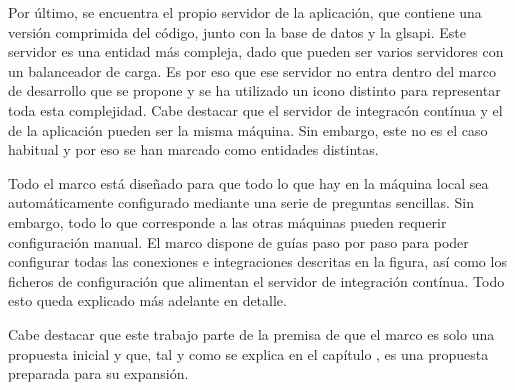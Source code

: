 Por último, se encuentra el propio servidor de la aplicación, que contiene una versión comprimida del código, junto con la base de datos y la gls{api}. Este servidor es una entidad más compleja, dado que pueden ser varios servidores con un balanceador de carga. Es por eso que ese servidor no entra dentro del marco de desarrollo que se propone y se ha utilizado un icono distinto para representar toda esta complejidad. Cabe destacar que el servidor de integracón contínua y el de la aplicación pueden ser la misma máquina. Sin embargo, este no es el caso habitual y por eso se han marcado como entidades distintas.

Todo el marco está diseñado para que todo lo que hay en la máquina local sea automáticamente configurado mediante una serie de preguntas sencillas. Sin embargo, todo lo que corresponde a las otras máquinas pueden requerir configuración manual. El marco dispone de guías paso por paso para poder configurar todas las conexiones e integraciones descritas en la figura, así como los ficheros de configuración que alimentan el servidor de integración contínua. Todo esto queda explicado más adelante en detalle.

Cabe destacar que este trabajo parte de la premisa de que el marco es solo una propuesta inicial y que, tal y como se explica en el capítulo , es una propuesta preparada para su expansión.
